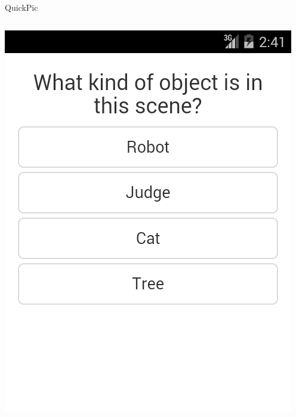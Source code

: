 \documentclass[aspectratio=169]{beamer}
\begin{document}
\begin{frame}{QuickPic}
\begin{columns}[c]
\begin{column}{0.5\columnwidth}
      \includegraphics[width=\columnwidth]{ss_quickpic_options}
    \end{column}
  \end{columns}
\end{frame}

\end{document}
